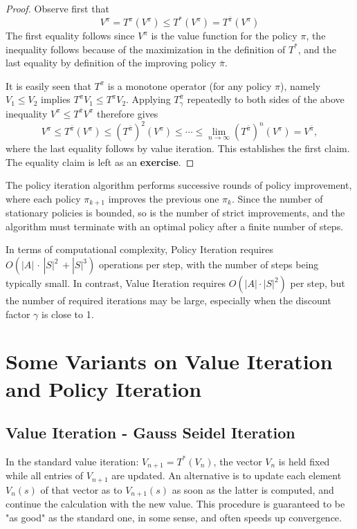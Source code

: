 \begin{proof} Observe first that
\[{V^\pi } = T_{}^\pi ({V^\pi }) \le T_{}^*({V^\pi }) = T_{}^{\bar \pi }({V^\pi })\]
The first equality follows since ${V^\pi }$ is the value function for the policy $\pi $, the inequality follows because of the maximization in the definition of  $T_{}^*$, and the last equality by definition of the improving policy $\bar \pi $.

It is easily seen that $T_{}^\pi $ is a monotone operator (for any policy $\pi $), namely ${V_1} \le {V_2}$ implies $T_{}^\pi {V_1} \le T_{}^\pi {V_2}$. Applying $T_\gamma ^{\bar \pi }$  repeatedly to both sides of the above inequality ${V^\pi } \le T_{}^{\bar \pi }{V^\pi }$ therefore gives
\[{V^\pi } \le T_{}^{\bar \pi }({V^\pi }) \le {(T_{}^{\bar \pi })^2}({V^\pi }) \le  \cdots  \le \mathop {\lim }\limits_{n \to \infty } {(T_{}^{\bar \pi })^n}({V^\pi }) = {V^{\bar \pi }},\]
where the last equality follows by value iteration. This establishes the first claim.
The equality claim is left as an \textbf{exercise}.
\end{proof}

The policy iteration algorithm performs successive rounds of policy improvement, where each policy ${\pi _{k + 1}}$ improves the previous one ${\pi _k}$. Since the number of stationary policies is bounded, so is the number of strict improvements, and the algorithm must terminate with an optimal policy after a finite number of steps.

In terms of computational complexity, Policy Iteration requires $O(|A|\, \cdot \,|S{|^2}\, + |S{|^3})$ operations per step, with the number of steps being typically small.
 In contrast, Value Iteration requires $O(|A| \cdot |S{|^2})$ per step, but the number of required iterations may be large, especially when the discount factor $\gamma $ is close to 1.


\section{Some Variants on Value Iteration and Policy Iteration}

\subsection{Value Iteration - Gauss Seidel Iteration}
In the standard value iteration: ${V_{n + 1}} = T_{}^*({V_n})$, the vector ${V_n}$ is held fixed while all entries of ${V_{n + 1}}$ are updated.
An alternative is to update each element ${V_n}(s)$ of that vector as to ${V_{n + 1}}(s)$ as soon as the latter is computed, and continue the calculation with the new value.
This procedure is guaranteed to be "as good" as the standard one, in some sense, and often speeds up convergence.


